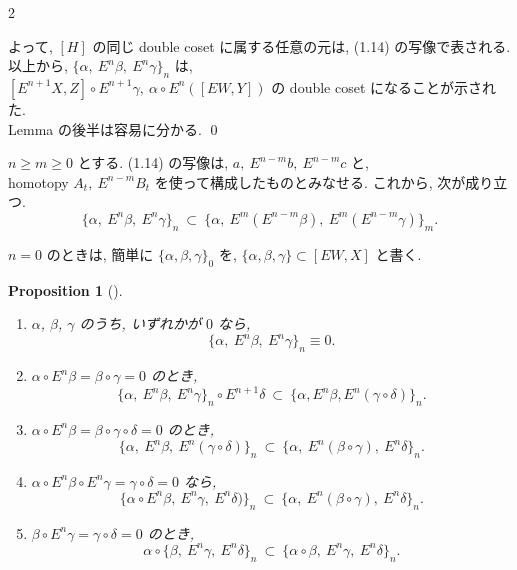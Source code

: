 \documentclass[10pt, leqno]{ltjsarticle}
\newcommand{\Ex}{E}        %
\numberwithin{equation}{section}
\theoremstyle{plain}
\newtheorem{proposition}[theorem]{Proposition}
\theoremstyle{definition}
\theoremstyle{remark}
\begin{document}
\begin{paracol}{2}

よって,
\([H]\)
の同じ double coset に属する任意の元は,
(1.14) の写像で表される.\\
以上から,
\(
\{\alpha,\ \Ex^n\beta,\ \Ex^n\gamma\}_n
\)
は,\\
\([E^{n+1}X,Z]\circ E^{n+1}\gamma,\ \alpha\circ E^n([EW,Y])\)
の double coset になることが示された. \\
Lemma の後半は容易に分かる.
\qed

\(n\ge m\ge 0\) とする.
(1.14) の写像は,
\(a,\ E^{n-m}b,\ E^{n-m}c\) と, \\
homotopy \(A_t,\ E^{n-m}B_t\)
を使って構成したものとみなせる.
これから, 次が成り立つ.
\begin{equation}\label{eq:split-m}
\{\alpha,\ \Ex^n\beta,\ \Ex^n\gamma\}_n
\ \subset\
\bigl\{\alpha,\ \Ex^{m}(E^{n-m}\beta),\ E^{m}(E^{n-m}\gamma)\bigr\}_m .
\end{equation}

$n=0$ のときは, 
簡単に $\{\alpha,\beta,\gamma\}_0$ を,
$\{\alpha,\beta,\gamma\} \subset[\Ex W, X]$ と書く. 

\begin{proposition}[]\label{prop:1-2}
\leavevmode
\begin{enumerate}
\item[\textnormal{0).}] $\alpha$, $\beta$, $\gamma$ のうち, いずれかが $0$ なら,
\[
\{\alpha,\ \Ex^n\beta,\ \Ex^n\gamma\}_n\equiv0.
\]
\item[\textnormal{i).}] $\alpha\circ \Ex^n\beta=\beta\circ\gamma=0$ のとき,
\[
\{\alpha,\ \Ex^n\beta,\ \Ex^n\gamma\}_n\circ\Ex^{n+1}\delta\ \subset\ \{\alpha,\Ex^n \beta, \Ex^n(\gamma\circ\delta)\}_n.
\]
\item[\textnormal{ii).}] $\alpha\circ \Ex^n\beta=\beta\circ\gamma\circ\delta=0$ のとき,
\[
\{\alpha,\ \Ex^n\beta,\ \Ex^n(\gamma\circ\delta)\}_n\ \subset\ \{\alpha,\ \Ex^n(\beta\circ\gamma),\ \Ex^n\delta\}_n .
\]
\item[\textnormal{iii).}] $\alpha\circ\Ex^n\beta\circ\Ex^n\gamma=\gamma\circ\delta=0$ なら,
\[
\{\alpha\circ\Ex^n\beta,\ \Ex^n\gamma,\ \Ex^n\delta)\}_n\ \subset\ \{\alpha,\ \Ex^n(\beta\circ\gamma),\ \Ex^n\delta\}_n .
\]
\item[\textnormal{iv).}] $\beta\circ\Ex^n\gamma=\gamma\circ\delta=0$ のとき,
\[
\alpha\circ\{\beta,\ \Ex^n\gamma,\ \Ex^n\delta\}_n\ \subset\ \{\alpha\circ\beta,\ \Ex^n\gamma,\ \Ex^n\delta\}_n .
\]
\end{enumerate}
\end{proposition}


\end{paracol}
\end{document}
